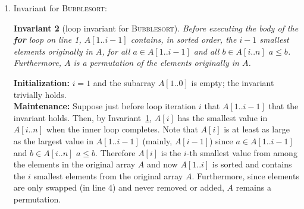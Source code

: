 \documentclass[letterpaper,11pt]{article}
\newtheorem{invariant}{Invariant}
\begin{document}
\begin{enumerate}
\begin{enumerate}
\begin{invariant}[loop invariant for the inner loop of \textsc{Bubblesort}]
\label{invariant:bubblesort-inner}
Before executing the body of the \textbf{for} loop on line 2, $A[j-1]$ is the smallest element among $A[j-1..n]$ and $A[j-1..n]$
is a permutation of $A[j-1..n]$ from the previous loop.
\end{invariant}

We now show that this invariant holds during initialization, that it is maintained between iterations of the loop, and that it implies correctness of the algorithm at termination.\\

\noindent\textbf{Initialization:} $j = n$ and the subarray $A[n..n]$ consists of one element that is trivially the smallest among $A[n..n]$ and a permutation.\\

\noindent\textbf{Maintenance:} Suppose just before loop $A[j]$ is the smallest element in $A[j..n]$, then either $A[j-1] < A[j]$ or $A[j-1]$ and $A[j]$ are swapped on line 4, and then $A[j-1]$ is the smallest elements in $A[j-1..n]$ at the beginning of loop $j-1$. Furthermore, since elements are only swapped, $A[j-1..n]$ is still a permutation.\\

\noindent\textbf{Termination:} Before the final iteration of the \textbf{for} line 4 (where $j = i+1$ and the loop body does not execute), then $A[i]$ is the smallest number in $A[i..n]$ and $A[i..n]$ is a permutation of $A[i..n]$ before the first iteration of the loop.\\

\item Invariant for \textsc{Bubblesort}:

\begin{invariant}[loop invariant for \textsc{Bubblesort}]
Before executing the body of the \textbf{for} loop on line 1, $A[1..i-1]$ contains, in sorted order, the $i-1$ smallest elements originally in $A$, for all $a\in A[1..i-1]$ and all $b\in A[i..n]$ $a\leq b$. Furthermore, $A$ is a permutation of the elements originally in $A$.
\end{invariant}

\noindent\textbf{Initialization:} $i = 1$ and the subarray $A[1..0]$ is empty; the invariant trivially holds.\\

\noindent\textbf{Maintenance:} Suppose just before loop iteration $i$ that $A[1..i-1]$ that the invariant holds. Then, by Invariant~\ref{invariant:bubblesort-inner}, $A[i]$ has the smallest value in $A[i..n]$ when the inner loop completes. Note that $A[i]$ is at least as large as the largest value in $A[1..i-1]$ (mainly, $A[i-1]$) since $a\in A[1..i-1]$ and $b\in A[i..n]$ $a\leq b$. Therefore $A[i]$ is the $i$-th smallest value from among the elements in the original array $A$ and now $A[1..i]$ is sorted and contains the $i$ smallest elements from the original array $A$. Furthermore, since elements are only swapped (in line 4) and never removed or added, $A$ remains a permutation.\\


\end{enumerate}
\end{enumerate}
\end{document}
